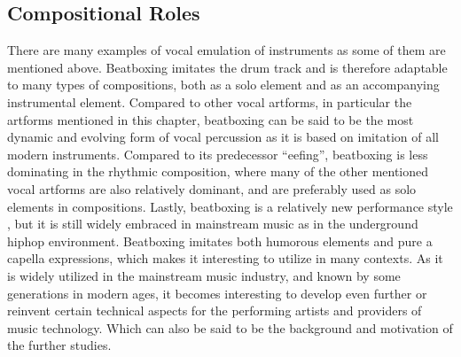 \subsection{ Compositional Roles }
There are many examples of vocal emulation of instruments as some of them are mentioned above. Beatboxing imitates the drum track and is therefore adaptable to many types of compositions, both as a solo element and as an accompanying instrumental element. Compared to other vocal artforms, in particular the artforms mentioned in this chapter, beatboxing can be said to be the most dynamic and evolving form of vocal percussion as it is based on imitation of all modern instruments. Compared to its predecessor “eefing”, beatboxing is less dominating in the rhythmic composition, where many of the other mentioned vocal artforms are also relatively dominant, and are preferably used as solo elements in compositions. Lastly, beatboxing is a relatively new performance style \citep{Stowell2008}, but it is still widely embraced in mainstream music as in the underground hiphop environment. Beatboxing imitates both humorous elements and pure a capella expressions, which makes it interesting to utilize in many contexts. 
As it is widely utilized in the mainstream music industry, and known by some generations in modern ages, it becomes interesting to develop even further or reinvent certain technical aspects for the performing artists and providers of music technology. Which can also be said to be the background and motivation of the further studies.